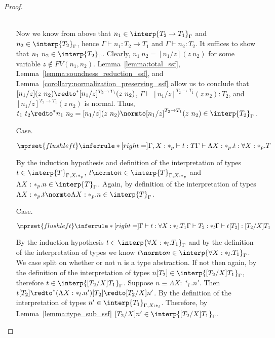 \begin{proof}
\begin{itemize}
  \ \\
  Now we know from above that $n_1 \in \interp{T_2 \rightarrow T_1}_\Gamma$ and
  $n_2 \in \interp{T_2}_\Gamma$, hence $\Gamma \vdash n_1:T_2 \to T_1$ and
  $\Gamma \vdash n_2:T_2$.  It suffices to show that $n_1\ n_2 \in \interp{T_2}_\Gamma$.
  Clearly, $n_1\ n_2 = [n_1/z](z\ n_2)$ for some variable $z \not \in FV(n_1,n_2)$.  
  Lemma~\ref{lemma:total_ssf}, Lemma~\ref{lemma:soundness_reduction_ssf}, 
  and Lemma~\ref{corollary:normalization_preserving_ssf} allow us to conclude that 
  $[n_1/z](z\ n_2) \redto^* [n_1/z]^{T_2 \to T_1}(z\ n_2)$, $\Gamma \vdash [n_1/z]^{T_2 \to T_1}(z\ n_2):T_2$,
  and $[n_1/z]^{T_2 \to T_1}(z\ n_2)$ is normal.  Thus, 
  $t_1\ t_2 \redto^* n_1\ n_2 = [n_1/z](z\ n_2) \normto [n_1/z]^{T_2 \to T_1}(z\ n_2) \in \interp{T_2}_\Gamma$.
  
\item[Case.]\ \\
  \begin{center}
    \begin{math}
      $$\mprset{flushleft}
      \inferrule* [right=] {
        \Gamma, X : *_p \vdash t : T
      }{\Gamma \vdash \Lambda X:*_p.t:\forall X:*_p.T}
    \end{math}
  \end{center}
  By the induction hypothesis and definition of the interpretation of types 
  $t \in \interp{T}_{\Gamma,X:*_p}$, $t \normto n \in \interp{T}_{\Gamma,X:*_p}$ and 
  $\Lambda X:*_p.n \in \interp{T}_{\Gamma}$.  Again, by definition of the interpretation 
  of types $\Lambda X:*_p.t \normto \Lambda X:*_p.n \in \interp{T}_{\Gamma}$.

\item[Case.]\ \\
  \begin{center}
    \begin{math}
      $$\mprset{flushleft}
      \inferrule* [right=] {
        \Gamma \vdash t:\forall X:*_l.T_1
        \\
        \Gamma \vdash T_2:*_l
      }{\Gamma \vdash t[T_2]: [T_2/X]T_1}
    \end{math}
  \end{center}
  By the induction hypothesis $t \in \interp{\forall X:*_l.T_1}_\Gamma$ and by the 
  definition of the interpretation of types we know 
  $t \normto n \in \interp{\forall X:*_l.T_1}_\Gamma$.  We case
  split on whether or not $n$ is a type abstraction. If not then again, by the 
  definition of the interpretation of types 
  $n[T_2] \in \interp{[T_2/X]T_1}_\Gamma$, therefore 
  $t \in \interp{[T_2/X]T_1}_\Gamma$.  Suppose $n \equiv \Lambda X:*_l.n'$.  Then 
  $t[T_2] \redto^* (\Lambda X:*_l.n')[T_2] \redto [T_2/X]n'$.  By the definition 
  of the interpretation of types $n' \in \interp{T_1}_{\Gamma,X:*_l}$. Therefore, by
  Lemma~\ref{lemma:type_sub_ssf} $[T_2/X]n' \in \interp{[T_2/X]T_1}_{\Gamma}$.
\end{itemize}
\end{proof}
